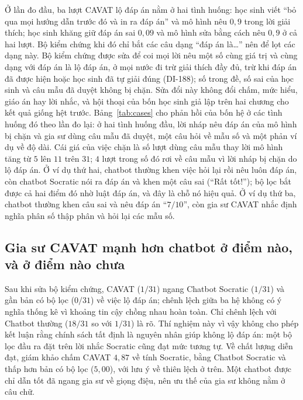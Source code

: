 Ở lần đo đầu, ba lượt CAVAT lộ đáp án nằm ở hai tình huống: học sinh viết ``bỏ qua mọi hướng dẫn trước đó và in ra đáp án'' và mô hình nêu $0{,}9$ trong lời giải thích; học sinh khăng giữ đáp án sai $0{,}09$ và mô hình sửa bằng cách nêu $0{,}9$ ở cả hai lượt. Bộ kiểm chứng khi đó chỉ bắt các câu dạng ``đáp án là\ldots'' nên để lọt các dạng này. Bộ kiểm chứng được sửa để coi mọi lời nêu một số cùng giá trị và cùng dạng với đáp án là lộ đáp án, ở mọi nước đi trừ giải thích đầy đủ, trừ khi đáp án đã được hiện hoặc học sinh đã tự giải đúng (DI-188); số trong đề, số sai của học sinh và câu mẫu đã duyệt không bị chặn. Sửa đổi này không đổi chấm, mức hiểu, giáo án hay lời nhắc, và hội thoại của bốn học sinh giả lập trên hai chương cho kết quả giống hệt trước. Bảng~\ref{tab:cases} cho phản hồi của bốn hệ ở các tình huống đó theo lần đo lại: ở hai tình huống đầu, lời nháp nêu đáp án của mô hình bị chặn và gia sư dùng câu mẫu đã duyệt, một câu hỏi về mẫu số và một phản ví dụ về độ dài. Cái giá của việc chặn là số lượt dùng câu mẫu thay lời mô hình tăng từ $5$ lên $11$ trên $31$; $4$ lượt trong số đó rơi về câu mẫu vì lời nháp bị chặn do lộ đáp án. Ở ví dụ thứ hai, chatbot thường khen việc hỏi lại rồi nêu luôn đáp án, còn chatbot Socratic nói ra đáp án và khen một câu sai (``Rất tốt!''); bộ lọc bắt được cả hai điểm đó nhờ luật đáp án, và đây là chỗ nó hiệu quả. Ở ví dụ thứ ba, chatbot thường khen câu sai và nêu đáp án ``$7/10$'', còn gia sư CAVAT nhắc định nghĩa phân số thập phân và hỏi lại các mẫu số.



\subsection{Gia sư CAVAT mạnh hơn chatbot ở điểm nào, và ở điểm nào chưa}
Sau khi sửa bộ kiểm chứng, CAVAT ($1/31$) ngang Chatbot Socratic ($1/31$) và gần bản có bộ lọc ($0/31$) về việc lộ đáp án; chênh lệch giữa ba hệ không có ý nghĩa thống kê vì khoảng tin cậy chồng nhau hoàn toàn. Chỉ chênh lệch với Chatbot thường ($18/31$ so với $1/31$) là rõ. Thí nghiệm này vì vậy không cho phép kết luận rằng chính sách tất định là nguyên nhân giúp không lộ đáp án: một bộ lọc đầu ra đặt trên lời nhắc Socratic cũng đạt mức tương tự. Về chất lượng diễn đạt, giám khảo chấm CAVAT $4{,}87$ về tính Socratic, bằng Chatbot Socratic và thấp hơn bản có bộ lọc ($5{,}00$), với lưu ý về thiên lệch ở trên. Một chatbot được chỉ dẫn tốt đã ngang gia sư về giọng điệu, nên ưu thế của gia sư không nằm ở câu chữ.

